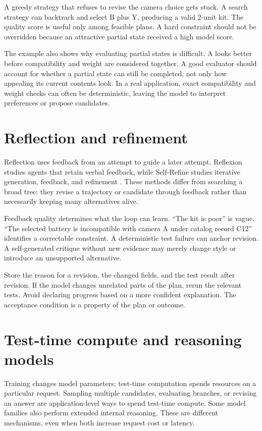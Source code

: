 A greedy strategy that refuses to revise the camera choice gets stuck. A search strategy can backtrack and select B plus Y, producing a valid 2-unit kit. The quality score is useful only among feasible plans. A hard constraint should not be overridden because an attractive partial state received a high model score.

The example also shows why evaluating partial states is difficult. A looks better before compatibility and weight are considered together. A good evaluator should account for whether a partial state can still be completed, not only how appealing its current contents look. In a real application, exact compatibility and weight checks can often be deterministic, leaving the model to interpret preferences or propose candidates.

\section{Reflection and refinement}
Reflection uses feedback from an attempt to guide a later attempt. Reflexion studies agents that retain verbal feedback, while Self-Refine studies iterative generation, feedback, and refinement \cite{reflexion,self-refine}. These methods differ from searching a broad tree: they revise a trajectory or candidate through feedback rather than necessarily keeping many alternatives alive.

Feedback quality determines what the loop can learn. “The kit is poor” is vague. “The selected battery is incompatible with camera A under catalog record C12” identifies a correctable constraint. A deterministic test failure can anchor revision. A self-generated critique without new evidence may merely change style or introduce an unsupported alternative.

Store the reason for a revision, the changed fields, and the test result after revision. If the model changes unrelated parts of the plan, rerun the relevant tests. Avoid declaring progress based on a more confident explanation. The acceptance condition is a property of the plan or outcome.

\section{Test-time compute and reasoning models}
Training changes model parameters; test-time computation spends resources on a particular request. Sampling multiple candidates, evaluating branches, or revising an answer are application-level ways to spend test-time compute. Some model families also perform extended internal reasoning. These are different mechanisms, even when both increase request cost or latency.

